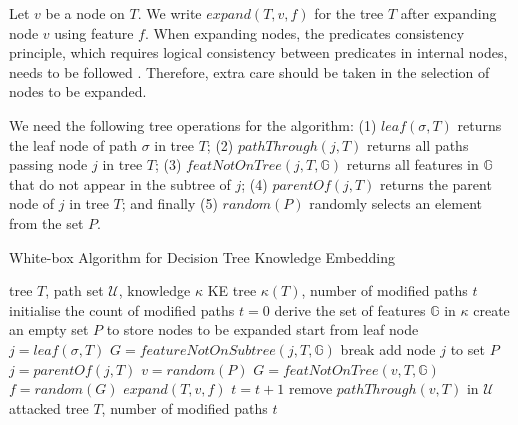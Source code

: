 Let $v$ be a node on $T$. We write $expand(T,v,f)$ for the tree $T$ after expanding node $v$ using feature $f$. 
%
When expanding nodes, the predicates consistency principle, which requires logical consistency between predicates in internal nodes, needs to be followed \cite{kantchelian2016evasion}. Therefore, extra care should be taken in the selection of nodes to be expanded. 

We need the following 
tree operations for the algorithm:  
  (1) $leaf(\sigma,T)$ returns the leaf node of path $\sigma$ in tree $T$; 
  (2) $pathThrough(j,T)$ returns all paths passing node $j$ in tree $T$; 
  (3) $featNotOnTree(j,T,\mathbb{G})$ returns all features in  $\mathbb{G}$ that do not appear in the subtree of $j$; 
  (4) $parentOf(j,T)$ returns the parent node of $j$ in tree $T$; and finally 
  (5) $random(P)$ randomly selects an element from the set $P$. 


\begin{algorithm}[!htbp]
 \caption{White-box Algorithm for Decision Tree Knowledge Embedding}
 \label{alg:backdoor_insertion}
 \begin{algorithmic}[1]
 \renewcommand{\algorithmicrequire}{\textbf{Input:}}
 \renewcommand{\algorithmicensure}{\textbf{Output:}}
 \REQUIRE  tree $T$, path set $\mathcal{U}$,  knowledge $\kappa$
 \ENSURE KE tree $\kappa(T)$, number of modified paths $t$
 \STATE initialise the count of modified paths $t=0$
 \STATE derive the set of features $\mathbb{G}$ in $\kappa$ 
 \STATE create an empty set $P$ to store nodes to be expanded
 \STATE start from leaf node $j = leaf(\sigma,T)$
 \STATE $G = featureNotOnSubtree(j,T,\mathbb{G})$ %
 \STATE break %
 \ENDIF
 \STATE add node $j$ to set $P$
 \STATE $j = parentOf(j,T)$
 \ENDWHILE 
 \STATE $v = random(P)$  %
 \STATE $G = featNotOnTree(v,T,\mathbb{G})$  %
 \STATE $f = random(G)$ %
 \STATE $expand(T,v,f)$ %
 \STATE $t = t + 1$
 \STATE remove $pathThrough(v,T)$ in $\mathcal{U}$
 \ENDFOR
 \RETURN attacked tree $T$, number of modified paths $t$
 \end{algorithmic} 
\end{algorithm} 


